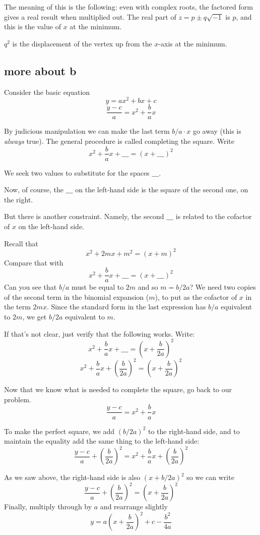 \documentclass[11pt, oneside]{article}
\begin{document}
The meaning of this is the following:  even with complex roots, the factored form gives a real result when multiplied out.  The real part of $z = p \pm q \sqrt{-1}$ is $p$, and this is the value of $x$ at the minimum.  

$q^2$ is the displacement of the vertex up from the $x$-axis at the minimum.

\subsection*{more about b}
Consider the basic equation
\[ y = ax^2 + bx + c \]
\[ \frac{y - c}{a} = x^2 + \frac{b}{a} x \]

By judicious manipulation we can make the last term $b/a \cdot x$ go away (this is  \emph{always} true).  The general procedure is called completing the square.  Write
\[ x^2 + \frac{b}{a} x + \_\_\_ = (x +  \_\_\_)^2 \]

We seek two values to substitute for the spaces $ \_\_\_$.  

Now, of course, the $\_\_\_$ on the left-hand side is the square of the second one, on the right.  

But there is another constraint.  Namely, the second $\_\_\_$ is related to the cofactor of $x$ on the left-hand side.

Recall that
\[ x^2 + 2mx + m^2 = (x + m)^2 \]
Compare that with 
\[ x^2 + \frac{b}{a} x + \_\_\_ = (x +  \_\_\_)^2 \]
Can you see that $b/a$ must be equal to $2m$ and so $m = b/2a$?  We need two copies of the second term in the binomial expansion ($m$), to put as the cofactor of $x$ in the term $2mx$.  Since the standard form in the last expression has $b/a$ equivalent to $2m$, we get $b/2a$ equivalent to $m$.

If that's not clear, just verify that the following works.  Write:
\[ x^2 + \frac{b}{a} x + \_\_\_ = (x +  \frac{b}{2a})^2 \]
\[ x^2 + \frac{b}{a} x + (\frac{b}{2a})^2 = (x +  \frac{b}{2a})^2 \]

Now that we know what is needed to complete the square, go back to our problem.
\[ \frac{y - c}{a} = x^2 + \frac{b}{a} x \]

To make the perfect square, we add $(b/2a)^2$ to the right-hand side, and to maintain the equality add the same thing to the left-hand side:
\[ \frac{y - c}{a} +  (\frac{b}{2a})^2 = x^2 + \frac{b}{a} x +  (\frac{b}{2a})^2 \]

As we saw above, the right-hand side is also $(x + b/2a)^2$ so we can write
\[ \frac{y - c}{a} +  (\frac{b}{2a})^2 = (x +  \frac{b}{2a})^2 \]
Finally, multiply through by $a$ and rearrange slightly
\[ y = a(x +  \frac{b}{2a})^2 + c - \frac{b^2}{4a}  \]
\end{document}
